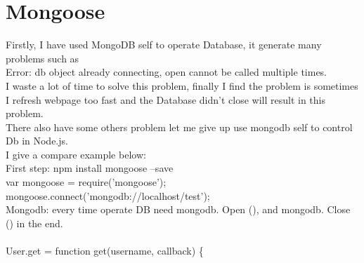 \section{Mongoose} \cite{10}
Firstly, I have used MongoDB self to operate Database, it generate many problems such as \\
Error: db object already connecting, open cannot be called multiple times.\\
I waste a lot of time to solve this problem, finally I find the problem is sometimes I refresh webpage too fast and the Database didn’t close will result in this problem.\\
There also have some others problem let me give up use mongodb self to control Db in Node.js.\\
I give a compare example below:\\
First step: npm install mongoose --save\\
var mongoose = require('mongoose');\\
mongoose.connect('mongodb://localhost/test');\\
Mongodb: every time operate DB need mongodb. Open (), and mongodb. Close () in the end. \\
\\
User.get = function get(username, callback) \{\\
